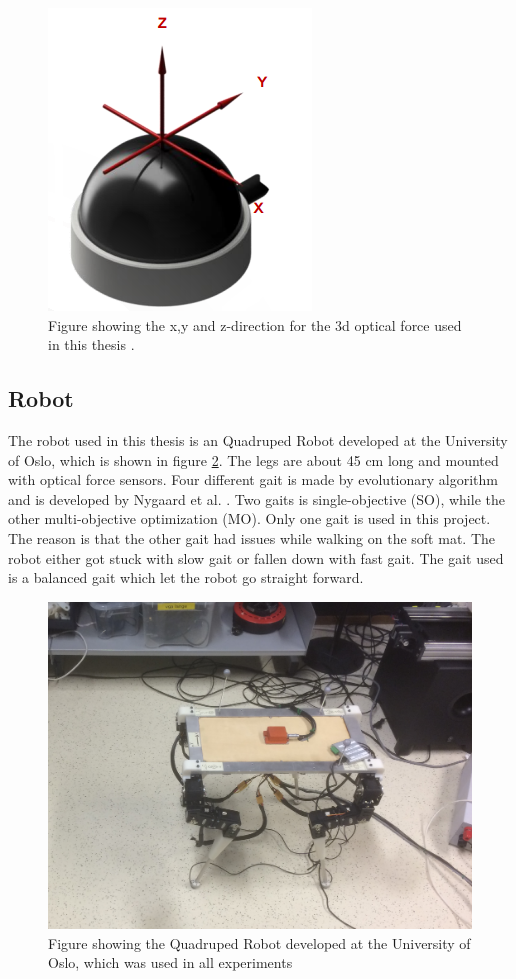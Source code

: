 \documentclass[USenglish]{ifimaster}  %
\begin{document}
\begin{figure}[h]
	\centering
	\includegraphics[scale=0.8]{Figures/OptoforceAxis3}
	\caption{Figure showing the x,y and z-direction for the 3d optical force used in this thesis \cite{OptoforceSheet}.}
	\label{fig:OptoforceAxis}
\end{figure}

\subsection{Robot}
The robot used in this thesis is an Quadruped Robot developed at the University of Oslo, which is shown in figure \ref{fig:robot}. The legs are about 45 cm long and mounted with optical force sensors. Four different gait is made by evolutionary algorithm and is developed by Nygaard et al. \cite{7850167}. Two gaits is single-objective (SO), while the other multi-objective optimization (MO). Only one gait is used in this project. The reason is that the other gait had issues while walking on the soft mat. The robot either got stuck with slow gait or fallen down with fast gait. The gait used is a balanced gait which let the robot go straight forward. 


\begin{figure}[h]
	\centering
	\includegraphics[width=\textwidth,height=\textheight,keepaspectratio]{Figures/Robot3}
	\caption{Figure showing the Quadruped Robot developed at the University of Oslo, which was used in all experiments}
	\label{fig:robot}
\end{figure}
\FloatBarrier
\end{document}
